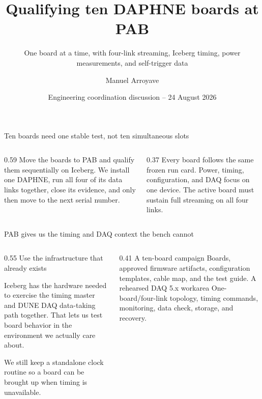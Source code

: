 \documentclass[aspectratio=169,11pt]{beamer}
\title[DAPHNE at PAB]{Qualifying ten DAPHNE boards at PAB}
\subtitle{One board at a time, with four-link streaming, Iceberg timing, power measurements, and self-trigger data}
\author{Manuel Arroyave}
\date{Engineering coordination discussion -- 24 August 2026}
\begin{document}
\begin{frame}[plain]
  \titlepage
\end{frame}

\begin{frame}{Ten boards need one stable test, not ten simultaneous slots}
  \begin{columns}[T,onlytextwidth]
    \begin{column}{0.59\textwidth}
        {Move the boards to PAB and qualify them sequentially on Iceberg.}
        {We install one DAPHNE, run all four of its data links together, close its evidence, and only then move to the next serial number.}
    \end{column}
    \begin{column}{0.37\textwidth}
        {Every board follows the same frozen run card.}
      \smallskip
        {Power, timing, configuration, and DAQ focus on one device.}
      \smallskip
        {The active board must sustain full streaming on all four links.}
    \end{column}
  \end{columns}
\end{frame}

\begin{frame}{PAB gives us the timing and DAQ context the bench cannot}
  \begin{columns}[T,onlytextwidth]
    \begin{column}{0.55\textwidth}
        {Use the infrastructure that already exists}
        {Iceberg has the hardware needed to exercise the timing master and DUNE DAQ data-taking path together. That lets us test board behavior in the environment we actually care about.\par\medskip
         We still keep a standalone clock routine so a board can be brought up when timing is unavailable.}
    \end{column}
    \begin{column}{0.41\textwidth}
        {A ten-board campaign}
        {Boards, approved firmware artifacts, configuration templates, cable map, and the test guide.}
      \smallskip
        {A rehearsed DAQ 5.x workarea}
        {One-board/four-link topology, timing commands, monitoring, data check, storage, and recovery.}
    \end{column}
  \end{columns}
\end{frame}
\end{document}
